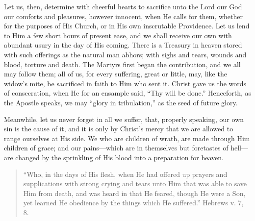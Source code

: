 Let us, then, determine with cheerful hearts to sacrifice unto the
Lord our God our comforts and pleasures, however innocent, when He
calls for them, whether for the purposes of His Church, or in His own
inscrutable Providence. Let us lend to Him a few short hours of
present ease, and we shall receive our own with abundant usury in the
day of His coming. There is a Treasury in heaven stored with such
offerings as the natural man abhors; with sighs and tears, wounds and
blood, torture and death. The Martyrs first began the contribution,
and we all may follow them; all of us, for every suffering, great or
little, may, like the widow's mite, be sacrificed in faith to Him who
sent it. Christ gave us the words of consecration, when He for an
ensample said, ``Thy will be done.'' Henceforth, as the
Apostle speaks, we may ``glory in tribulation,'' as the seed
of future glory.

Meanwhile, let us never forget in all we suffer, that, properly
speaking, our own sin is the cause of it, and it is only by Christ's
mercy that we are allowed to range ourselves at His side. We who are
children of wrath, are made through Him children of grace; and our
pains—which are in themselves but foretastes of hell—are changed
by the sprinkling of His blood into a preparation for heaven.


\begin{quote}

``Who, in the days of His flesh, when He had offered up
prayers and supplications with strong crying and tears unto Him that
was able to save Him from death, and was heard in that He feared,
though He were a Son, yet learned He obedience by the things which
He suffered.'' Hebrews v. 7, 8.

\end{quote}

